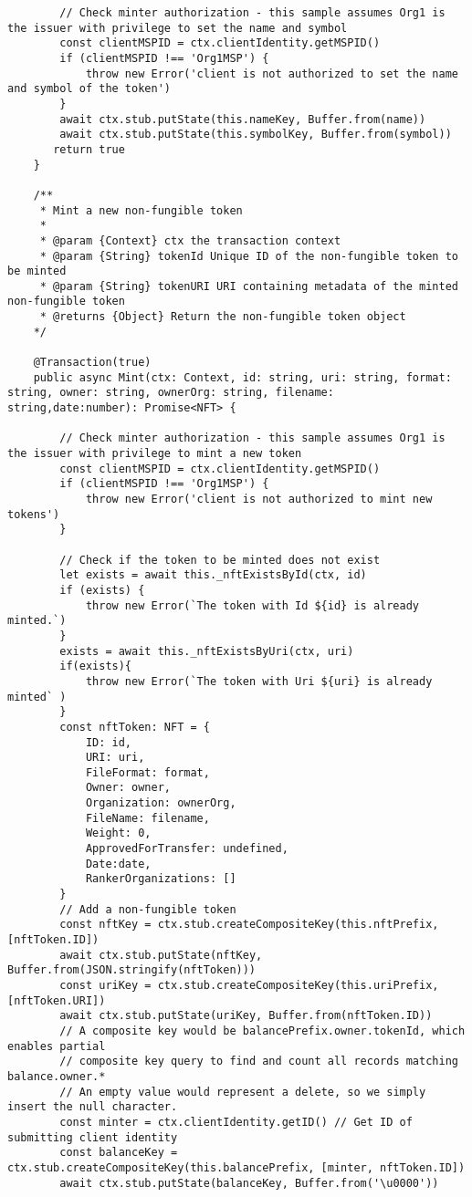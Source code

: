 \begin{lstlisting}
        // Check minter authorization - this sample assumes Org1 is the issuer with privilege to set the name and symbol
        const clientMSPID = ctx.clientIdentity.getMSPID()
        if (clientMSPID !== 'Org1MSP') {
            throw new Error('client is not authorized to set the name and symbol of the token')
        }
        await ctx.stub.putState(this.nameKey, Buffer.from(name))
        await ctx.stub.putState(this.symbolKey, Buffer.from(symbol))
       return true
    }

    /**
     * Mint a new non-fungible token
     *
     * @param {Context} ctx the transaction context
     * @param {String} tokenId Unique ID of the non-fungible token to be minted
     * @param {String} tokenURI URI containing metadata of the minted non-fungible token
     * @returns {Object} Return the non-fungible token object
    */

    @Transaction(true)
    public async Mint(ctx: Context, id: string, uri: string, format: string, owner: string, ownerOrg: string, filename: string,date:number): Promise<NFT> {

        // Check minter authorization - this sample assumes Org1 is the issuer with privilege to mint a new token
        const clientMSPID = ctx.clientIdentity.getMSPID()
        if (clientMSPID !== 'Org1MSP') {
            throw new Error('client is not authorized to mint new tokens')
        }

        // Check if the token to be minted does not exist
        let exists = await this._nftExistsById(ctx, id)
        if (exists) {
            throw new Error(`The token with Id ${id} is already minted.`)
        }
        exists = await this._nftExistsByUri(ctx, uri)
        if(exists){
            throw new Error(`The token with Uri ${uri} is already minted` )
        }
        const nftToken: NFT = {
            ID: id,
            URI: uri,
            FileFormat: format,
            Owner: owner,
            Organization: ownerOrg,
            FileName: filename,
            Weight: 0,
            ApprovedForTransfer: undefined,
            Date:date,
            RankerOrganizations: []
        }
        // Add a non-fungible token
        const nftKey = ctx.stub.createCompositeKey(this.nftPrefix, [nftToken.ID])
        await ctx.stub.putState(nftKey, Buffer.from(JSON.stringify(nftToken)))
        const uriKey = ctx.stub.createCompositeKey(this.uriPrefix, [nftToken.URI])
        await ctx.stub.putState(uriKey, Buffer.from(nftToken.ID))
        // A composite key would be balancePrefix.owner.tokenId, which enables partial
        // composite key query to find and count all records matching balance.owner.*
        // An empty value would represent a delete, so we simply insert the null character.
        const minter = ctx.clientIdentity.getID() // Get ID of submitting client identity
        const balanceKey = ctx.stub.createCompositeKey(this.balancePrefix, [minter, nftToken.ID])
        await ctx.stub.putState(balanceKey, Buffer.from('\u0000'))


\end{lstlisting}
